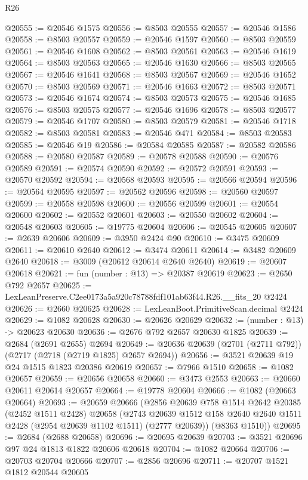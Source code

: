 \begin{lexlean}{R26}
\begin{coremodule}
@20555 := @20546 @1575
@20556 := @8503 @20555
@20557 := @20546 @1586
@20558 := @8503 @20557
@20559 := @20546 @1597
@20560 := @8503 @20559
@20561 := @20546 @1608
@20562 := @8503 @20561
@20563 := @20546 @1619
@20564 := @8503 @20563
@20565 := @20546 @1630
@20566 := @8503 @20565
@20567 := @20546 @1641
@20568 := @8503 @20567
@20569 := @20546 @1652
@20570 := @8503 @20569
@20571 := @20546 @1663
@20572 := @8503 @20571
@20573 := @20546 @1674
@20574 := @8503 @20573
@20575 := @20546 @1685
@20576 := @8503 @20575
@20577 := @20546 @1696
@20578 := @8503 @20577
@20579 := @20546 @1707
@20580 := @8503 @20579
@20581 := @20546 @1718
@20582 := @8503 @20581
@20583 := @20546 @471
@20584 := @8503 @20583
@20585 := @20546 @19
@20586 := @20584 @20585
@20587 := @20582 @20586
@20588 := @20580 @20587
@20589 := @20578 @20588
@20590 := @20576 @20589
@20591 := @20574 @20590
@20592 := @20572 @20591
@20593 := @20570 @20592
@20594 := @20568 @20593
@20595 := @20566 @20594
@20596 := @20564 @20595
@20597 := @20562 @20596
@20598 := @20560 @20597
@20599 := @20558 @20598
@20600 := @20556 @20599
@20601 := @20554 @20600
@20602 := @20552 @20601
@20603 := @20550 @20602
@20604 := @20548 @20603
@20605 := @19775 @20604
@20606 := @20545 @20605
@20607 := @2639 @20606
@20609 := @3950 @2424 @90
@20610 := @3475 @20609
@20611 := @20610 @2640
@20612 := @3474 @20611
@20614 := @3482 @20609 @2640
@20618 := @3009 (@20612 @20614 @2640 @2640)
@20619 := @20607 @20618
@20621 := fun (number : @13) => @20387 @20619
@20623 := @2650 @792 @2657
@20625 := LexLeanPreserve.C2ee0173a5a920c78788fdf101ab63f44.R26.__fits_20 @2424
@20626 := @2660 @20625
@20628 := LexLeanBoot.PrimitiveScan.decimal @2424
@20629 := @1082 @20628
@20630 := @20626 @20629
@20632 := (number : @13) -> @20623 @20630
@20636 := @2676 @792 @2657 @20630 @1825
@20639 := @2684 (@2691 @2655) @2694
@20649 := @20636 @20639 (@2701 (@2711 @792)) (@2717 (@2718 (@2719 @1825) @2657 @2694))
@20656 := @3521 @20639 @19 @24 @1515 @1823 @20386 @20619
@20657 := @7966 @1510
@20658 := @1082 @20657
@20659 := @20656 @20658
@20660 := @3473 @2553
@20663 := @20660 @20611 @20614 @20657
@20664 := @19778 @20604
@20666 := @1082 (@20663 @20664)
@20693 := @20659
    @20666
    (@2856
      @20639
      @758
      @1514
      @2642
      @20385
      (@2452 @1511 @2428)
      @20658
      (@2743 @20639 @1512 @158 @2640 @2640 @1511 @2428 (@2954 @20639 @1102 @1511) (@2777 @20639))
      (@8363 @1510))
@20695 := @2684 (@2688 @20658)
@20696 := @20695 @20639
@20703 := @3521 @20696 @97 @24 @1813 @1822 @20606 @20618
@20704 := @1082 @20664
@20706 := @20703 @20704 @20666
@20707 := @2856 @20696
@20711 := @20707 @1521 @1812 @20544 @20605

\end{coremodule}
\end{lexlean}
